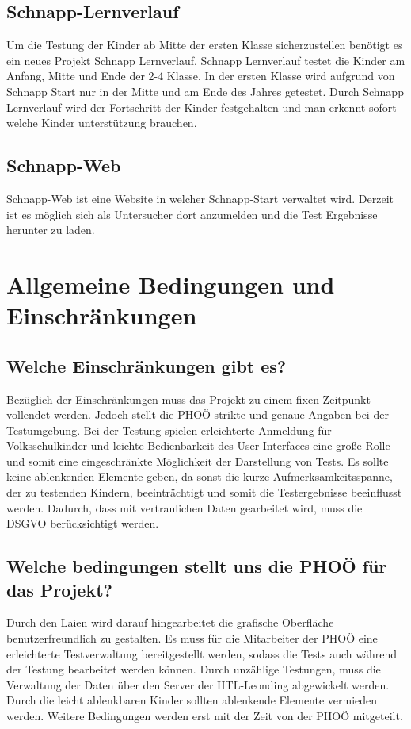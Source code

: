 \documentclass[12pt]{article}
\theoremstyle{definition}
\begin{document}
\subsection{Schnapp-Lernverlauf}
Um die Testung der Kinder ab Mitte der ersten Klasse sicherzustellen benötigt es ein neues Projekt Schnapp Lernverlauf.
Schnapp Lernverlauf testet die Kinder am  Anfang, Mitte und Ende der 2-4 Klasse. In der ersten Klasse wird aufgrund von Schnapp Start nur in der Mitte und am Ende des Jahres getestet.
Durch Schnapp Lernverlauf wird der Fortschritt der Kinder festgehalten und man erkennt sofort welche Kinder unterstützung brauchen.
\subsection{Schnapp-Web}
Schnapp-Web ist eine Website in welcher Schnapp-Start verwaltet wird. Derzeit ist es möglich sich als Untersucher dort anzumelden und die Test Ergebnisse herunter zu laden.
\newline

\pagebreak

\section{Allgemeine Bedingungen und Einschränkungen}


\subsection{Welche Einschränkungen gibt es?}

Bezüglich der Einschränkungen muss das Projekt zu einem fixen Zeitpunkt vollendet werden. Jedoch stellt die PHOÖ strikte und genaue Angaben bei der Testumgebung. Bei der Testung spielen erleichterte Anmeldung für Volksschulkinder und leichte Bedienbarkeit des User Interfaces eine große Rolle und somit eine eingeschränkte Möglichkeit der Darstellung von Tests. Es sollte keine ablenkenden Elemente geben, da sonst die kurze Aufmerksamkeitsspanne, der zu testenden Kindern, beeinträchtigt und somit die Testergebnisse beeinflusst werden.
Dadurch, dass mit vertraulichen Daten gearbeitet wird, muss die DSGVO berücksichtigt werden.


\subsection{Welche bedingungen stellt uns die PHOÖ für das Projekt?}

Durch den Laien wird darauf hingearbeitet die grafische Oberfläche benutzerfreundlich zu gestalten. Es muss für die Mitarbeiter der PHOÖ eine erleichterte Testverwaltung bereitgestellt werden, sodass die Tests auch während der Testung bearbeitet werden können. Durch unzählige Testungen, muss die Verwaltung der Daten über den Server der HTL-Leonding abgewickelt werden. Durch die leicht ablenkbaren Kinder sollten ablenkende Elemente vermieden werden. Weitere Bedingungen werden erst mit der Zeit von der PHOÖ mitgeteilt.
\end{document}
